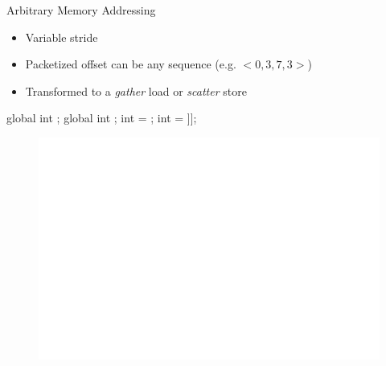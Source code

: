 
\begin{frame}[fragile]{Arbitrary Memory Addressing}

\begin{itemize}
    \item Variable stride
    \item Packetized offset can be any sequence (e.g. $<0, 3, 7, 3>$)
    \item Transformed to a \emph{gather} load or \emph{scatter} store
\end{itemize}

\begin{minipage}[t]{0.40\linewidth}
    \vspace{0.1ex}
    \begin{codebox}[commandchars=\\\[\]]
    
global int \uniform[*src];
global int \uniform[*map];
int \varying[tid] = ;
int \varying[x] = \uniform[src]\idx[\uniform[map]\idx[\varying[tid]]];




    \end{codebox}
\end{minipage}
\hspace{1em}
\begin{minipage}[t]{0.49\linewidth}
    \begin{figure}
        \includegraphics[scale=0.5]{images/arbitrary-access.pdf}
    \end{figure}
\end{minipage}

\end{frame}

